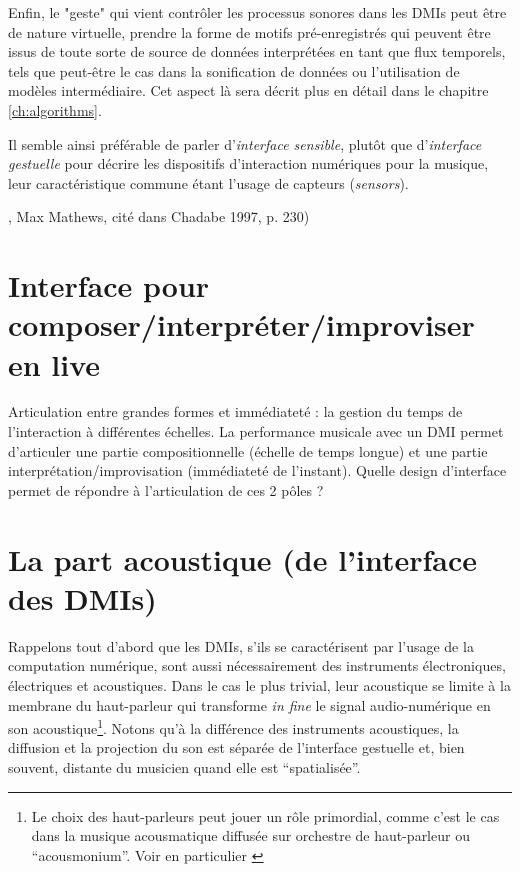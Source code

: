 Enfin, le "geste" qui vient contrôler les processus sonores dans les DMIs peut être de nature virtuelle, prendre la forme de motifs pré-enregistrés qui peuvent être issus de toute sorte de source de données interprétées en tant que flux temporels, tels que peut-être le cas dans la sonification de données ou l'utilisation de modèles intermédiaire. Cet aspect là sera décrit plus en détail dans le chapitre \ref{ch:algorithms}.

Il semble ainsi préférable de parler d'\textit{interface sensible}, plutôt que d'\textit{interface gestuelle} pour décrire les dispositifs d'interaction numériques pour la musique, leur caractéristique commune étant l'usage de capteurs (\textit{sensors}).

, Max Mathews, cité dans  Chadabe 1997, p. 230)


\section{Interface pour composer/interpréter/improviser en live}
Articulation entre grandes formes et immédiateté : la gestion du temps de l’interaction à différentes échelles.
La performance musicale avec un DMI permet d’articuler une partie compositionnelle (échelle de temps longue) et une partie interprétation/improvisation (immédiateté de l’instant). 
Quelle design d’interface permet de répondre à l’articulation de ces 2 pôles ?

\section{La part acoustique (de l'interface des \glspl{DMI})}
Rappelons tout d'abord que les \glspl{DMI}, s'ils se caractérisent par l'usage de la computation numérique, sont aussi nécessairement des instruments électroniques, électriques et acoustiques. 
Dans le cas le plus trivial, leur acoustique se limite à la membrane du haut-parleur qui transforme \textit{in fine} le signal audio-numérique en son acoustique\footnote{Le choix des haut-parleurs peut jouer un rôle primordial, comme c'est le cas dans la musique acousmatique diffusée sur orchestre de haut-parleur ou ``acousmonium''. Voir en particulier \cite{mooney_sound_2006}}. Notons qu'à la différence des instruments acoustiques, la diffusion et la projection du son est séparée de l'interface gestuelle et, bien souvent, distante du musicien quand elle est ``spatialisée''.

